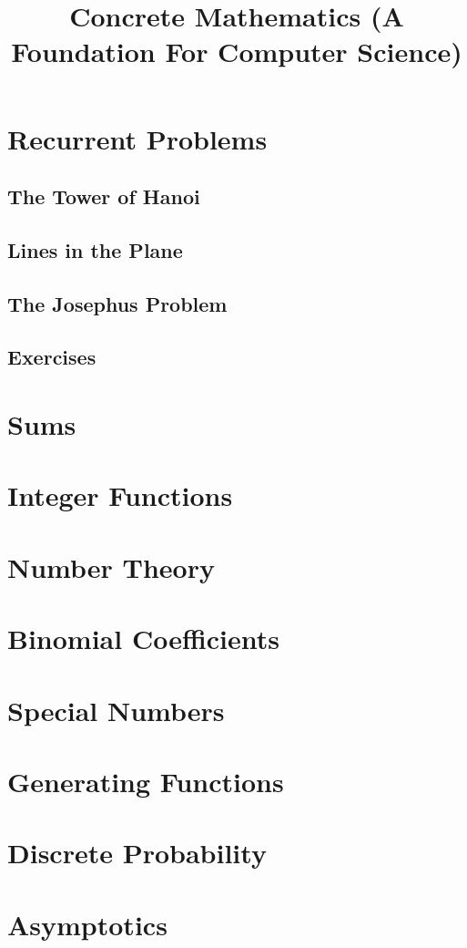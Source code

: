 \documentclass{book}
\begin{document}
\tableofcontents

\title{Concrete Mathematics (A Foundation For Computer Science)}

\chapter{Recurrent Problems}

\section{The Tower of Hanoi}
\section{Lines in the Plane}
\section{The Josephus Problem}
\section*{Exercises}

\chapter{Sums}

\chapter{Integer Functions}

\chapter{Number Theory}

\chapter{Binomial Coefficients}

\chapter{Special Numbers}

\chapter{Generating Functions}

\chapter{Discrete Probability}

\chapter{Asymptotics}
\end{document}
